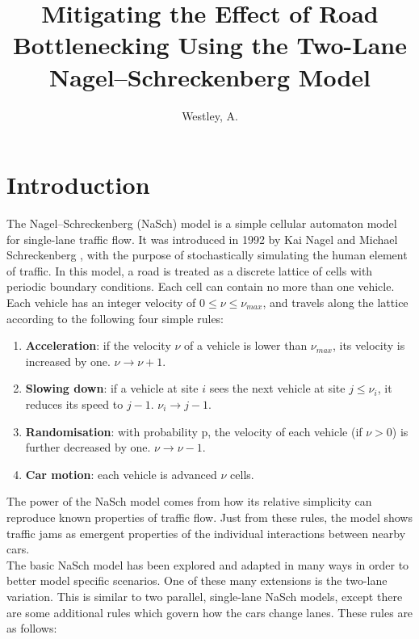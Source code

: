 \documentclass[11pt]{article}
\title{Mitigating the Effect of Road Bottlenecking Using the Two-Lane Nagel--Schreckenberg Model}
\author{Westley, A.}
\begin{document}
	
	\maketitle 
	
	\hfill \break
	
	\section{Introduction} \label{sec:intro}
	
	The Nagel--Schreckenberg (NaSch) model is a simple cellular automaton model for single-lane traffic flow. It was introduced in 1992 by Kai Nagel and Michael Schreckenberg \cite{nagel1992cellular}, with the purpose of stochastically simulating the human element of traffic. In this model, a road is treated as a discrete lattice of cells with periodic boundary conditions. Each cell can contain no more than one vehicle. Each vehicle has an integer velocity of $0 \leq \nu \leq \nu_{max}$, and travels along the lattice according to the following four simple rules: 
	
	\begin{enumerate}
		\item \textbf{Acceleration}: if the velocity $\nu$ of a vehicle is lower than $\nu_{max}$, its velocity is increased by one. $\nu \rightarrow \nu + 1$.
		\item \textbf{Slowing down}: if a vehicle at site $i$ sees the next vehicle at site $j \leq \nu_i$, it reduces its speed to $j-1$. $\nu_i \rightarrow j-1$.
		\item \textbf{Randomisation}: with probability p, the velocity of each vehicle (if $\nu > 0$) is further decreased by one. $\nu \rightarrow \nu - 1$.
		\item \textbf{Car motion}: each vehicle is advanced $\nu$ cells.
	\end{enumerate}
	
	The power of the NaSch model comes from how its relative simplicity can reproduce known properties of traffic flow. Just from these rules, the model shows traffic jams as emergent properties of the individual interactions between nearby cars. \\
	
	The basic NaSch model has been explored and adapted in many ways in order to better model specific scenarios. One of these many extensions is the two-lane variation. This is similar to two parallel, single-lane NaSch models, except there are some additional rules which govern how the cars change lanes\cite{wright2013flow}. These rules are as follows:
	
\end{document}
